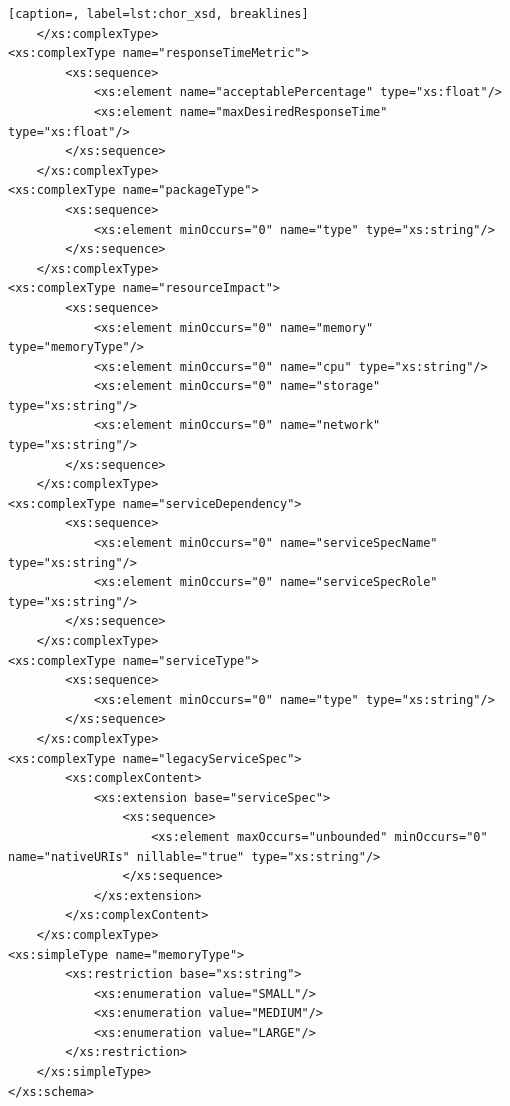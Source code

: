 {\begin{lstlisting}[caption=, label=lst:chor_xsd, breaklines]
    </xs:complexType>
<xs:complexType name="responseTimeMetric">
        <xs:sequence>
            <xs:element name="acceptablePercentage" type="xs:float"/>
            <xs:element name="maxDesiredResponseTime" type="xs:float"/>
        </xs:sequence>
    </xs:complexType>
<xs:complexType name="packageType">
        <xs:sequence>
            <xs:element minOccurs="0" name="type" type="xs:string"/>
        </xs:sequence>
    </xs:complexType>
<xs:complexType name="resourceImpact">
        <xs:sequence>
            <xs:element minOccurs="0" name="memory" type="memoryType"/>
            <xs:element minOccurs="0" name="cpu" type="xs:string"/>
            <xs:element minOccurs="0" name="storage" type="xs:string"/>
            <xs:element minOccurs="0" name="network" type="xs:string"/>
        </xs:sequence>
    </xs:complexType>
<xs:complexType name="serviceDependency">
        <xs:sequence>
            <xs:element minOccurs="0" name="serviceSpecName" type="xs:string"/>
            <xs:element minOccurs="0" name="serviceSpecRole" type="xs:string"/>
        </xs:sequence>
    </xs:complexType>
<xs:complexType name="serviceType">
        <xs:sequence>
            <xs:element minOccurs="0" name="type" type="xs:string"/>
        </xs:sequence>
    </xs:complexType>
<xs:complexType name="legacyServiceSpec">
        <xs:complexContent>
            <xs:extension base="serviceSpec">
                <xs:sequence>
                    <xs:element maxOccurs="unbounded" minOccurs="0" name="nativeURIs" nillable="true" type="xs:string"/>
                </xs:sequence>
            </xs:extension>
        </xs:complexContent>
    </xs:complexType>
<xs:simpleType name="memoryType">
        <xs:restriction base="xs:string">
            <xs:enumeration value="SMALL"/>
            <xs:enumeration value="MEDIUM"/>
            <xs:enumeration value="LARGE"/>
        </xs:restriction>
    </xs:simpleType>
</xs:schema>


\end{lstlisting}}
